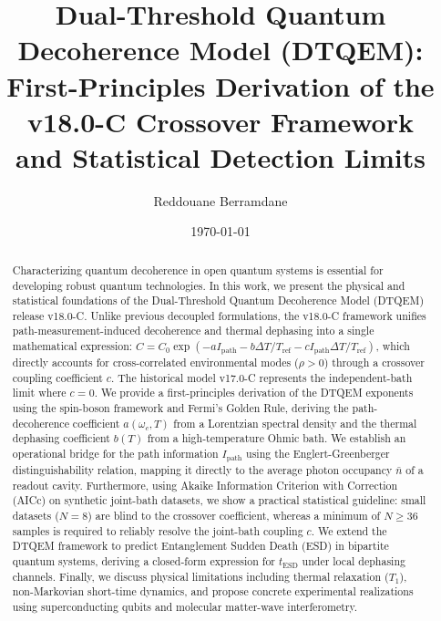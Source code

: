 \documentclass[reprint,amsmath,amssymb,aps,pra,superscriptaddress]{revtex4-2}
\begin{document}
\title{Dual-Threshold Quantum Decoherence Model (DTQEM): \\ 
       First-Principles Derivation of the v18.0-C Crossover Framework \\
       and Statistical Detection Limits}

\author{Reddouane Berramdane}

\date{\today}

\begin{abstract}
Characterizing quantum decoherence in open quantum systems is essential for developing robust quantum technologies. In this work, we present the physical and statistical foundations of the Dual-Threshold Quantum Decoherence Model (DTQEM) release v18.0-C. Unlike previous decoupled formulations, the v18.0-C framework unifies path-measurement-induced decoherence and thermal dephasing into a single mathematical expression: $C = C_0 \exp(-a I_{\text{path}} - b \Delta T/T_{\text{ref}} - c I_{\text{path}} \Delta T/T_{\text{ref}})$, which directly accounts for cross-correlated environmental modes ($\rho > 0$) through a crossover coupling coefficient $c$. The historical model v17.0-C represents the independent-bath limit where $c = 0$. We provide a first-principles derivation of the DTQEM exponents using the spin-boson framework and Fermi's Golden Rule, deriving the path-decoherence coefficient $a(\omega_c,T)$ from a Lorentzian spectral density and the thermal dephasing coefficient $b(T)$ from a high-temperature Ohmic bath. We establish an operational bridge for the path information $I_{\text{path}}$ using the Englert-Greenberger distinguishability relation, mapping it directly to the average photon occupancy $\bar{n}$ of a readout cavity. Furthermore, using Akaike Information Criterion with Correction (AICc) on synthetic joint-bath datasets, we show a practical statistical guideline: small datasets ($N=8$) are blind to the crossover coefficient, whereas a minimum of $N \ge 36$ samples is required to reliably resolve the joint-bath coupling $c$. We extend the DTQEM framework to predict Entanglement Sudden Death (ESD) in bipartite quantum systems, deriving a closed-form expression for $t_{\text{ESD}}$ under local dephasing channels. Finally, we discuss physical limitations including thermal relaxation ($T_1$), non-Markovian short-time dynamics, and propose concrete experimental realizations using superconducting qubits and molecular matter-wave interferometry.
\end{abstract}
\end{document}

